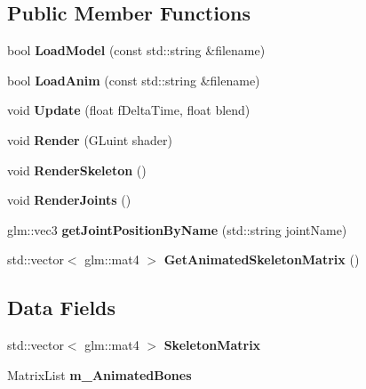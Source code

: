 \subsection*{Public Member Functions}
\begin{DoxyCompactItemize}
\item 
bool {\bfseries Load\+Model} (const std\+::string \&filename)\hypertarget{class_m_d5_model_acf87019fc5b1b071c9f870a67f6bfb1f}{}\label{class_m_d5_model_acf87019fc5b1b071c9f870a67f6bfb1f}

\item 
bool {\bfseries Load\+Anim} (const std\+::string \&filename)\hypertarget{class_m_d5_model_a6447eb17a7c651c93a6d5e8b05894539}{}\label{class_m_d5_model_a6447eb17a7c651c93a6d5e8b05894539}

\item 
void {\bfseries Update} (float f\+Delta\+Time, float blend)\hypertarget{class_m_d5_model_adc4a0b3a8d6118e32007517b511b4efc}{}\label{class_m_d5_model_adc4a0b3a8d6118e32007517b511b4efc}

\item 
void {\bfseries Render} (G\+Luint shader)\hypertarget{class_m_d5_model_a1dbf73e77aabbf4e4a06dfef4623fc48}{}\label{class_m_d5_model_a1dbf73e77aabbf4e4a06dfef4623fc48}

\item 
void {\bfseries Render\+Skeleton} ()\hypertarget{class_m_d5_model_a2138fb6001b7fac6222e5fdba20ee929}{}\label{class_m_d5_model_a2138fb6001b7fac6222e5fdba20ee929}

\item 
void {\bfseries Render\+Joints} ()\hypertarget{class_m_d5_model_ac4e8c4da88e673bb062ff2a7c31ba918}{}\label{class_m_d5_model_ac4e8c4da88e673bb062ff2a7c31ba918}

\item 
glm\+::vec3 {\bfseries get\+Joint\+Position\+By\+Name} (std\+::string joint\+Name)\hypertarget{class_m_d5_model_aba436fd966ee9a32cbf5325b6e73b1d1}{}\label{class_m_d5_model_aba436fd966ee9a32cbf5325b6e73b1d1}

\item 
std\+::vector$<$ glm\+::mat4 $>$ {\bfseries Get\+Animated\+Skeleton\+Matrix} ()\hypertarget{class_m_d5_model_a8e64f2869b7cb8757bc37dcae197d91d}{}\label{class_m_d5_model_a8e64f2869b7cb8757bc37dcae197d91d}

\end{DoxyCompactItemize}
\subsection*{Data Fields}
\begin{DoxyCompactItemize}
\item 
std\+::vector$<$ glm\+::mat4 $>$ {\bfseries Skeleton\+Matrix}\hypertarget{class_m_d5_model_aa66a2ce0e76a71866bc1925891c3735c}{}\label{class_m_d5_model_aa66a2ce0e76a71866bc1925891c3735c}

\item 
Matrix\+List {\bfseries m\+\_\+\+Animated\+Bones}\hypertarget{class_m_d5_model_a92f58728b9c837b7b7b8ac027ba16903}{}\label{class_m_d5_model_a92f58728b9c837b7b7b8ac027ba16903}

\end{DoxyCompactItemize}
